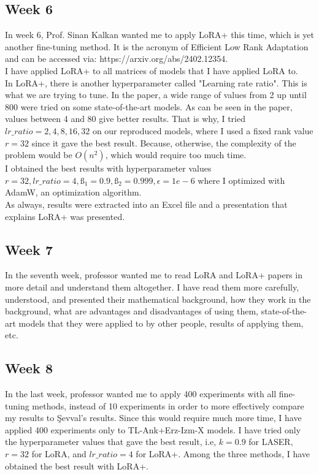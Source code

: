 \documentclass{article}
\begin{document}
\subsection{Week 6}
\hspace{0.5cm}
In week 6, Prof. Sinan Kalkan wanted me to apply LoRA+ this time, which is yet another fine-tuning method. It is the acronym of Efficient Low Rank Adaptation and can be accessed via: https://arxiv.org/abs/2402.12354.\\

I have applied LoRA+ to all matrices of models that I have applied LoRA to.\\

In LoRA+, there is another hyperparameter called "Learning rate ratio". This is what we are trying to tune. In the paper, a wide range of values from 2 up until 800 were tried on some state-of-the-art models. As can be seen in the paper, values between 4 and 80 give better results. That is why, I tried $lr\_ratio=2,4,8,16,32$ on our reproduced models, where I used a fixed rank value $r=32$ since it gave the best result. Because, otherwise, the complexity of the problem would be $O(n^2)$, which would require too much time.\\

I obtained the best results with hyperparameter values $r=32, lr\_ratio=4, ß_1=0.9, ß_2=0.999, \epsilon=1e-6$ where I optimized with AdamW, an optimization algorithm.\\

As always, results were extracted into an Excel file and a presentation that explains LoRA+ was presented.

\subsection{Week 7}
\hspace{0.5cm}
In the seventh week, professor wanted me to read LoRA and LoRA+ papers in more detail and understand them altogether. I have read them more carefully, understood, and presented their mathematical background, how they work in the background, what are advantages and disadvantages of using them, state-of-the-art models that they were applied to by other people, results of applying them, etc.

\subsection{Week 8}
\hspace{0.5cm}
In the last week, professor wanted me to apply 400 experiments with all fine-tuning methods, instead of 10 experiments in order to more effectively compare my results to Şevval's results. Since this would require much more time, I have applied 400 experiments only to TL-Ank+Erz-Izm-X models. I have tried only the hyperparameter values that gave the best result, i.e, $k=0.9$ for LASER, $r=32$ for LoRA, and $lr\_ratio=4$ for LoRA+. Among the three methods, I have obtained the best result with LoRA+.
\newpage
\end{document}
